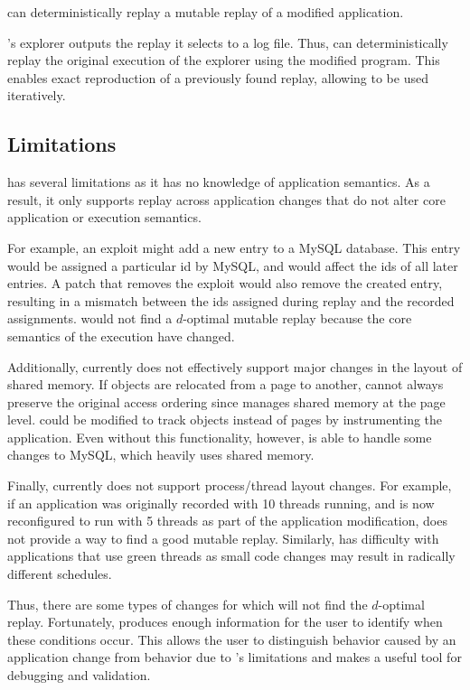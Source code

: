 \begin{property}
	{\dora} can deterministically replay a mutable replay of a
	modified application.
\end{property}
	{\dora}'s explorer outputs the replay it selects to a log file. Thus, {\dora} can
	deterministically replay the original execution of the explorer using the
	modified program. This enables exact reproduction of a previously found
	replay, allowing {\dora} to be used iteratively.
\subsection{Limitations}
\label{sec:limitations}

{\dora} has several limitations as it has no knowledge of application
semantics.  As a result, it only supports replay across application changes
that do not alter core application or execution semantics.

For example, an exploit might add a new entry to a MySQL database. This entry
would be assigned a particular id by MySQL, and would affect the ids of all
later entries. A patch that removes the exploit would also remove the created
entry, resulting in a mismatch between the ids assigned during replay and the recorded assignments. {\dora} would not find a
$d$-optimal mutable replay because the core semantics of the execution have
changed.

Additionally, {\dora} currently does not effectively support major changes in the
layout of shared memory. If objects are relocated from a page to another, {\dora} cannot always
preserve the original access ordering since {\dora} manages
shared memory at the page level. {\dora} could be modified to track
objects instead of pages by instrumenting the application.
Even without this functionality, however, {\dora} is able to handle
some changes to MySQL, which heavily uses shared memory.

Finally, {\dora} currently does not support process/thread layout changes. For
example, if an application was originally recorded with 10 threads running, and
is now reconfigured to run with 5 threads as part of the application
modification, {\dora} does not provide a way to find a good mutable replay.
Similarly, {\dora} has difficulty with applications that use green
threads as small code changes may result in radically different
schedules.

Thus, there are some types of changes for which {\dora} will not find the
$d$-optimal replay.  Fortunately, {\dora} produces enough information for the
user to identify when these conditions occur. This allows the user to
distinguish behavior caused by an application change from behavior due to
{\dora}'s limitations and makes {\dora} a useful tool for debugging and
validation.

